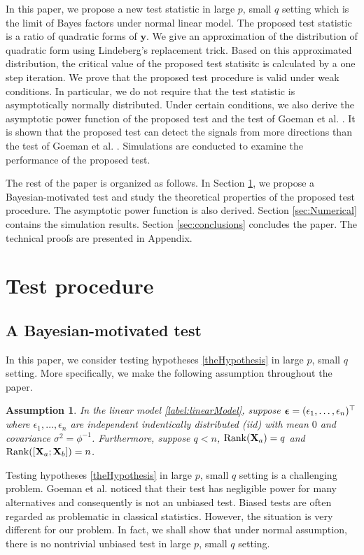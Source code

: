 \documentclass[bj]{imsart}
\DeclareMathOperator{\myRank}{Rank}
\newcommand{\By}{\mathbf{y}}    \newcommand{\Bz}{\mathbf{z}}
\theoremstyle{plain}
\newtheorem{assumption}{\quad\quad Assumption}
\theoremstyle{definition}
\theoremstyle{remark}
\begin{document}
In this paper, we propose a new test statistic in large $p$, small $q$ setting which is the limit of Bayes factors under normal linear model.
The proposed test statistic is a ratio of quadratic forms of $\By$.
We give an approximation of the distribution of quadratic form using Lindeberg's replacement trick.
Based on this approximated distribution, the critical value of the proposed test statisitc is calculated by a one step iteration.
We prove that the proposed test procedure is valid under weak conditions.
In particular, we do not require that the test statistic is asymptotically normally distributed.
Under certain conditions, we also derive the asymptotic power function of the proposed test and the test of Goeman {\rm et al.} \cite{Goeman2006}.
It is shown that the proposed test can detect the signals from more directions than the test of Goeman {\rm et al.} \cite{Goeman2006}.
Simulations are conducted to examine the performance of the proposed test.


The rest of the paper is organized as follows.
In Section \ref{sec:methodology}, we propose a Bayesian-motivated test and study the theoretical properties of the proposed test procedure.
The asymptotic power function is also derived.
Section \ref{sec:Numerical} contains the simulation results. 
Section \ref{sec:conclusions} concludes the paper.
The technical proofs are presented in Appendix.




\section{Test procedure}\label{sec:methodology}
\subsection{A Bayesian-motivated test}
In this paper, we consider testing hypotheses \eqref{theHypothesis} in large $p$, small $q$ setting.
More specifically, we make the following assumption throughout the paper.
\begin{assumption}
    In the linear model \eqref{label:linearModel}, 
    suppose $\boldsymbol{\epsilon}=(\epsilon_1,\ldots,\epsilon_n)^\top$ where $\epsilon_1,\ldots, \epsilon_n$ are independent indentically distributed (iid) with mean $0$ and covariance $\sigma^2=\phi^{-1}$.
    Furthermore, suppose $q<n$, $\myRank(\BX_a)=q$ and $\myRank([\BX_a; \BX_b])=n$.
    \label{Assumption}
\end{assumption}
Testing hypotheses \eqref{theHypothesis} in large $p$, small $q$ setting is a challenging problem.
Goeman {\rm et al.} \cite{Goeman2006} noticed that their test has negligible power for many alternatives and consequently is not an unbiased test.
Biased tests are often regarded as problematic in classical statistics.
However, the situation is very different for our problem.
In fact, we shall show that under normal assumption, there is no nontrivial unbiased test in large $p$, small $q$ setting.
\end{document}
